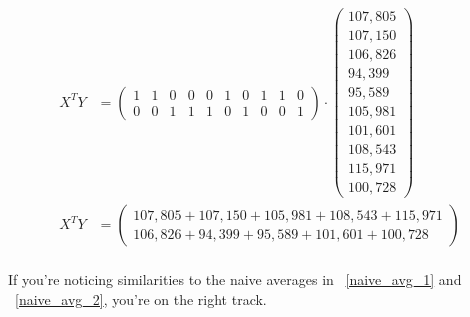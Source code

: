 \begin{align}
X^T Y &= 
\left(\begin{array}{cccccccccc}
         1 & 1 & 0 & 0 & 0 & 1 & 0 & 1 & 1 & 0 \\
         0 & 0 & 1 & 1 & 1 & 0 & 1 & 0 & 0 & 1
\end{array}\right)
\cdot
\left(\begin{array}{c}
         107,805 \\ 
         107,150 \\ 
         106,826 \\ 
          94,399 \\ 
          95,589 \\ 
         105,981 \\ 
         101,601 \\ 
         108,543 \\ 
         115,971 \\ 
         100,728 
\end{array}\right)
\\
X^T Y &= 
\left(\begin{array}{c}
         107,805 + 107,150 + 105,981 + 108,543 + 115,971 \\
         106,826 +  94,399 +  95,589 + 101,601 + 100,728 
\end{array}\right)
\end{align}
\\
If you're noticing similarities to the naive averages in ~\ref{naive_avg_1} and
~\ref{naive_avg_2}, you're on the right track.\\

